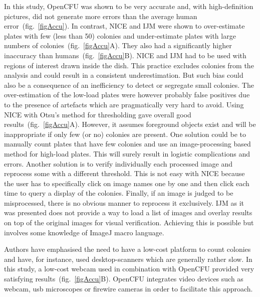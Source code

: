 \documentclass[10pt]{article}
\newcommand{\IJM}{IJM}
\begin{document}
In this study, OpenCFU was shown to be very accurate and, with high-definition
pictures, did not generate more errors than the average human error~(fig.~\ref{figAccu}). 
In contrast, NICE and \IJM{} were shown to
over-estimate plates with few (less than 50) colonies and under-estimate plates
with large numbers 
of colonies~(fig.~\ref{figAccu}A). They also had a significantly
higher inaccuracy than humans~(fig.~\ref{figAccu}B). NICE and \IJM{} had to be
used with regions of interest drawn inside the dish. This practice excludes
colonies from the analysis and could result in a
consistent underestimation. But such bias could also be a consequence of an inefficiency to detect or segregate
 small colonies.
The over-estimation of the low-load plates were however probably false positives
due to the presence of artefacts which are pragmatically very hard to avoid.
Using NICE with Otsu's method for thresholding gave overall good results~(fig.~\ref{figAccu}A).
However, it assumes foreground objects exist and will be inappropriate
if only few (or no) colonies are present. One
solution could be to manually count plates that have few colonies and use an
image-processing based method for high-load plates. This will surely result in
logistic complications and errors. Another solution is to verify individually
each processed image and reprocess some with a different threshold.
This is not easy with NICE because the user has to specifically click on image
names one by one and then click each time to query a display of the colonies.
Finally, if an image is judged to be misprocessed, there is no obvious manner to
reprocess it exclusively.
\IJM{} as it was presented
does not provide a way to load a list of images and
overlay results on top of the original images for visual verification. Achieving
this is possible but involves some knowledge of ImageJ macro language.


Authors have emphasised the need to have a low-cost platform to count colonies
and have, for instance, used
desktop-scanners\cite{marotz_effective_2001,putman_simplified_2005,clarke_lowcost_2010,cai_optimized_2011
} which are generally rather slow. In this study, a low-cost webcam used in
combination with OpenCFU provided very satisfying results~(fig.~\ref{figAccu}B). OpenCFU integrates
video devices such as webcam, usb microscopes or firewire cameras in order to
facilitate this approach.
\end{document}
